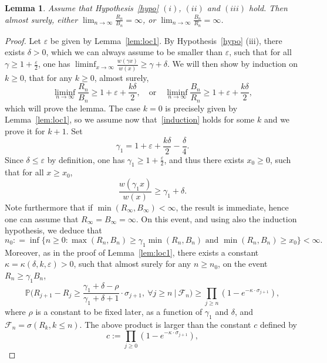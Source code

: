 \documentclass[11pt]{article}
\newtheorem {lem} {Lemma} [section]
\newcommand{\1}{{\text{\Large $\mathfrak 1$}}}
\begin{document}
\begin{lem}\label{lem:loc2}
Assume that Hypothesis~\ref{hypo} $(i)$, $(ii)$ and $(iii)$ hold. Then almost surely, 
either $\lim_{n\to \infty} \frac{R_n}{B_n}= \infty$, or $\lim_{n\to \infty}\frac{B_n}{R_n} =  \infty$. 
\end{lem}
\begin{proof}
Let $\varepsilon$ be given by Lemma~\ref{lem:loc1}. By Hypothesis~\ref{hypo} (iii), there exists $\delta>0$, which we can always assume to be smaller than $\varepsilon$, such that for all $\gamma\ge 1+\frac{\varepsilon}{2}$, one has 
$\liminf_{x\to \infty}\frac{w(\gamma x)}{w(x)} \ge \gamma + \delta$. 
We will then show by induction on $k\ge 0$, that for any $k\ge 0$, almost surely, 
\begin{equation}\label{induction}
\liminf_{n\to \infty} \frac{R_n}{B_n}\ge 1+\varepsilon + \frac{k\delta}{2}, \quad \text{or} \quad \liminf_{n\to \infty} \frac{B_n}{R_n}\ge 1+\varepsilon + \frac{k\delta}{2},  
\end{equation}
which will prove the lemma.  The case $k=0$ is precisely given by Lemma~\ref{lem:loc1}, so we assume now that~\eqref{induction} holds for some $k$ and we prove it for $k+1$. Set 
$$\gamma_1 = 1+ \varepsilon + \frac{k\delta}{2}-\frac{\delta}{4}.$$
Since $\delta\le \varepsilon$ by definition, one has $\gamma_1\ge 1+ \frac{\varepsilon}{2}$, and thus there exists $x_0\ge 0$, such that for all $x\ge x_0$, 
$$\frac{w(\gamma_1 x)}{w(x)} \ge \gamma_1 + \delta.$$
Note furthermore that if $ \min(R_\infty,B_\infty)<\infty$, the result is immediate, hence one can assume that $R_\infty = B_\infty = \infty$. 
On this event, and using also the induction hypothesis, we deduce that 
$$n_0 : =  \inf \big\{ n\ge 0 : \max(R_n,B_n) \ge \gamma_1 \min(R_n,B_n) \text{ and } \min(R_n,B_n)  \ge x_0\big\} <\infty. $$ 
Moreover, as in the proof of Lemma~\ref{lem:loc1}, there exists a constant $\kappa=\kappa(\delta,k,\varepsilon)>0$, such that almost surely for any $n\ge n_0$, 
on the event $ R_n\ge \gamma_1 B_n$, 
\begin{equation}\label{induction.accroissements}
\mathbb P\Big(R_{j+1} - R_j \ge \frac{\gamma_1 + \delta-\rho}{\gamma_1 + \delta+1} \cdot \sigma_{j+1}, \ \forall j\ge n\ \Big|\ \mathcal F_n\Big)\ge \prod_{j\ge n} (1- e^{-\kappa \cdot\sigma_{j+1}}), 
\end{equation}
where $\rho$ is a constant to be fixed later, as a function of $\gamma_1$ and $\delta$, and $\mathcal F_n = \sigma(R_k,k\le n)$. 
The above product is larger than the constant $c$ defined by 
$$c:= \prod_{j\ge 0}  (1- e^{-\kappa \cdot\sigma_{j+1}}),$$

\end{proof}
\end{document}
